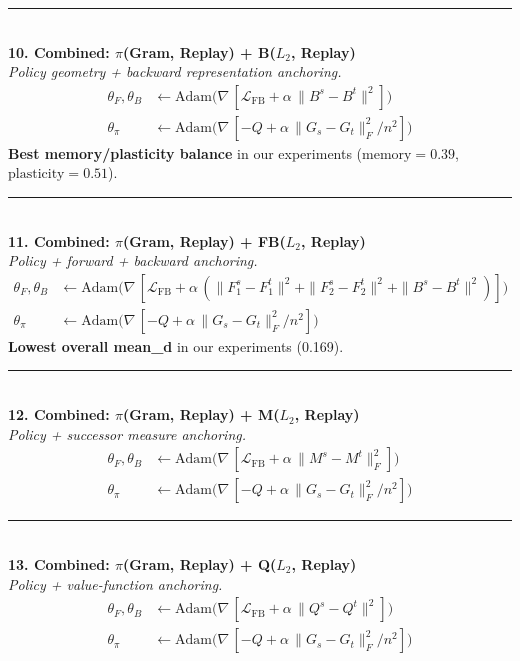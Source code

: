 \documentclass[10pt]{article}
\newcommand{\loss}{\mathcal{L}}
\newcommand{\method}[2]{%
  \noindent\rule{\textwidth}{0.5pt}\\[2pt]
  {\large\textbf{#1}}\\[2pt]
  \textit{#2}\\[4pt]
}
\begin{document}
\method{10. Combined: $\pi$(Gram, Replay) + B($L_2$, Replay)}{Policy geometry + backward representation anchoring.}
\vspace{-0.5em}
\begin{align*}
\theta_F, \theta_B &\leftarrow \mathrm{Adam}\bigl(\nabla\,[\loss_{\text{FB}} + \alpha\,\|B^s - B^t\|^2]\bigr)\\
\theta_\pi &\leftarrow \mathrm{Adam}\bigl(\nabla\,[-Q + \alpha\,\|G_s - G_t\|_F^2/n^2]\bigr)
\end{align*}
\textbf{Best memory/plasticity balance} in our experiments ($\text{memory}=0.39$, $\text{plasticity}=0.51$).

\method{11. Combined: $\pi$(Gram, Replay) + FB($L_2$, Replay)}{Policy + forward + backward anchoring.}
\vspace{-0.5em}
\begin{align*}
\theta_F, \theta_B &\leftarrow \mathrm{Adam}\bigl(\nabla\,[\loss_{\text{FB}} + \alpha\,(\|F_1^s{-}F_1^t\|^2 + \|F_2^s{-}F_2^t\|^2 + \|B^s{-}B^t\|^2)]\bigr)\\
\theta_\pi &\leftarrow \mathrm{Adam}\bigl(\nabla\,[-Q + \alpha\,\|G_s - G_t\|_F^2/n^2]\bigr)
\end{align*}
\textbf{Lowest overall mean\_d} in our experiments (0.169).

\method{12. Combined: $\pi$(Gram, Replay) + M($L_2$, Replay)}{Policy + successor measure anchoring.}
\vspace{-0.5em}
\begin{align*}
\theta_F, \theta_B &\leftarrow \mathrm{Adam}\bigl(\nabla\,[\loss_{\text{FB}} + \alpha\,\|M^s - M^t\|_F^2]\bigr)\\
\theta_\pi &\leftarrow \mathrm{Adam}\bigl(\nabla\,[-Q + \alpha\,\|G_s - G_t\|_F^2/n^2]\bigr)
\end{align*}

\method{13. Combined: $\pi$(Gram, Replay) + Q($L_2$, Replay)}{Policy + value-function anchoring.}
\vspace{-0.5em}
\begin{align*}
\theta_F, \theta_B &\leftarrow \mathrm{Adam}\bigl(\nabla\,[\loss_{\text{FB}} + \alpha\,\|Q^s - Q^t\|^2]\bigr)\\
\theta_\pi &\leftarrow \mathrm{Adam}\bigl(\nabla\,[-Q + \alpha\,\|G_s - G_t\|_F^2/n^2]\bigr)
\end{align*}
\end{document}
